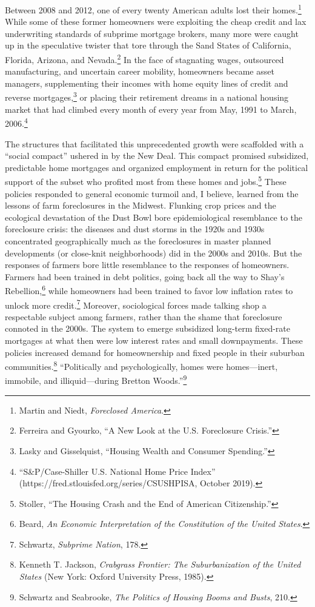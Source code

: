 \documentclass[12pt,oneside]{psthesis}
\begin{document}
Between 2008 and 2012, one of every twenty American adults lost their homes.\footnote{Martin and Niedt, \emph{Foreclosed America}.}
While some of these former homeowners were exploiting the cheap credit and lax underwriting standards of subprime mortgage brokers, many more were caught up in the speculative twister that tore through the Sand States of California, Florida, Arizona, and Nevada.\footnote{Ferreira and Gyourko, ``A New Look at the U.S. Foreclosure Crisis.''}
In the face of stagnating wages, outsourced manufacturing, and uncertain career mobility, homeowners became asset managers, supplementing their incomes with home equity lines of credit and reverse mortgages,\footnote{Lasky and Gisselquist, ``Housing Wealth and Consumer Spending.''} or placing their retirement dreams in a national housing market that had climbed every month of every year from May, 1991 to March, 2006.\footnote{``S\&P/Case-Shiller U.S. National Home Price Index'' (https://fred.stlouisfed.org/series/CSUSHPISA, October 2019).}

The structures that facilitated this unprecedented growth were scaffolded with a ``social compact'' ushered in by the New Deal.
This compact promised subsidized, predictable home mortgages and organized employment in return for the political support of the subset who profited most from these homes and jobs.\footnote{Stoller, ``The Housing Crash and the End of American Citizenship.''}
These policies responded to general economic turmoil and, I believe, learned from the lessons of farm foreclosures in the Midwest.
Flunking crop prices and the ecological devastation of the Dust Bowl bore epidemiological resemblance to the foreclosure crisis: the diseases and dust storms in the 1920s and 1930s concentrated geographically much as the foreclosures in master planned developments (or close-knit neighborhoods) did in the 2000s and 2010s.
But the responses of farmers bore little resemblance to the responses of homeowners.
Farmers had been trained in debt politics, going back all the way to Shay's Rebellion,\footnote{Beard, \emph{An Economic Interpretation of the Constitution of the United States}.} while homeowners had been trained to favor low inflation rates to unlock more credit.\footnote{Schwartz, \emph{Subprime Nation}, 178.}
Moreover, sociological forces made talking shop a respectable subject among farmers, rather than the shame that foreclosure connoted in the 2000s.
The system to emerge subsidized long-term fixed-rate mortgages at what then were low interest rates and small downpayments.
These policies increased demand for homeownership and fixed people in their suburban communities.\footnote{Kenneth T. Jackson, \emph{Crabgrass Frontier: The Suburbanization of the United States} (New York: Oxford University Press, 1985).}
``Politically and psychologically, homes were homes---inert, immobile, and illiquid---during Bretton Woods.''\footnote{Schwartz and Seabrooke, \emph{The Politics of Housing Booms and Busts}, 210.}
\end{document}
